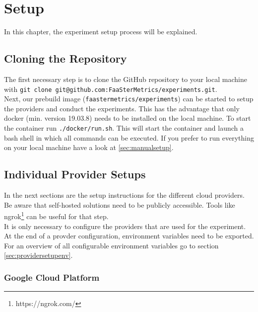 \documentclass[../main.tex]{subfiles}
\begin{document}
\section{Setup}\label{sec:setup}
In this chapter, the experiment setup process will be explained.


\subsection{Cloning the Repository}\label{sec:clonesetup}
The first necessary step is to clone the GitHub repository to your local machine with \texttt{git clone git@github.com:FaaSterMetrics/experiments.git}. \\
Next, our prebuild image (\texttt{faastermetrics/experiments}) can be started to setup the providers and conduct the experiments. This has the advantage that only docker (min. version 19.03.8) needs to be installed on the local machine. To start the container run \texttt{./docker/run.sh}. This will start the container and launch a bash shell in which all commands can be executed.
If you prefer to run everything on your local machine have a look at \ref{sec:manualsetup}.

\subsection{Individual Provider Setups}\label{sec:providersetup}

In the next sections are the setup instructions for the different cloud providers. Be aware that self-hosted solutions need to be publicly accessible. Tools like ngrok\footnote{https://ngrok.com/} can be useful for that step. \\
It is only necessary to configure the providers that are used for the experiment. At the end of a provder configuration, environment variables need to be exported. For an overview of all configurable environment variables go to section \ref{sec:providersetupenv}.


\subsubsection{Google Cloud Platform}\label{sec:providersetupgcp}
\end{document}
